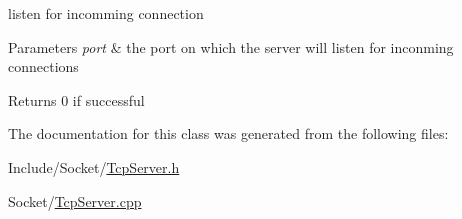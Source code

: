 listen for incomming connection 


\begin{DoxyParams}{\-Parameters}
{\em port} & the port on which the server will listen for inconming connections \\
\hline
\end{DoxyParams}
\begin{DoxyReturn}{\-Returns}
0 if successful 
\end{DoxyReturn}


\-The documentation for this class was generated from the following files\-:\begin{DoxyCompactItemize}
\item 
\-Include/\-Socket/\hyperlink{_tcp_server_8h}{\-Tcp\-Server.\-h}\item 
\-Socket/\hyperlink{_tcp_server_8cpp}{\-Tcp\-Server.\-cpp}\end{DoxyCompactItemize}
